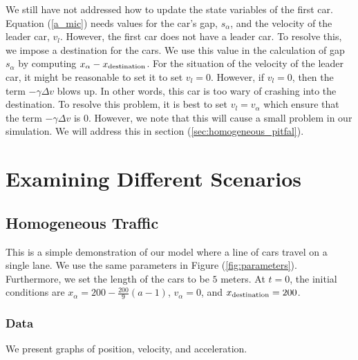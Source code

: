 \documentclass[12pt]{article}
\begin{document}
    We still have not addressed how to update the state variables of the first car. Equation (\ref{a_mic}) needs values for the car's gap, $s_\alpha$, and the velocity of the leader car, $v_l$. However, the first car does not have a leader car. To resolve this, we impose a destination for the cars. We use this value in the calculation of gap $s_\alpha$ by computing $x_\alpha - x_{\rm destination}$. For the situation of the velocity of the leader car, it might be reasonable to set it to set $v_l = 0$. However, if $v_l=0$, then the term $-\gamma \Delta v$ blows up. In other words, this car is too wary of crashing into the destination. To resolve this problem, it is best to set $v_l = v_\alpha$ which ensure that the term $-\gamma \Delta v$ is $0$. However, we note that this will cause a small problem in our simulation. We will address this in section (\ref{sec:homogeneous_pitfal}). 
    
    
    \section{Examining Different Scenarios}
    \subsection{Homogeneous Traffic}\label{sec:homogeneous}

    This is a simple demonstration of our model where a line of cars travel on a single lane. We use the same parameters in Figure (\ref{fig:parameters}). Furthermore, we set the length of the cars to be $5$ meters. At $t=0$, the initial conditions are $x_\alpha = 
    200-\frac{200}{9}\left(a-1\right)$, $v_\alpha = 0$, and $x_{\rm destination} = 200$.

    \subsubsection{Data}
    We present graphs of position, velocity, and acceleration.
    
\end{document}
